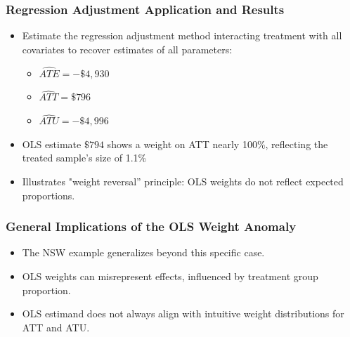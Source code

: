 \documentclass{beamer}
\begin{document}
\begin{frame}
\frametitle{Regression Adjustment Application and Results}
\begin{itemize}
  \item Estimate the regression adjustment method interacting treatment with all covariates to recover estimates of all parameters:
    \begin{itemize}
      \item \( \widehat{ATE} = -\$4,930 \)
      \item \( \widehat{ATT} = \$796 \)
      \item \( \widehat{ATU} = -\$4,996 \)
    \end{itemize}
  \item OLS estimate \( \$794 \) shows a weight on ATT nearly 100\%, reflecting the treated sample's size of 1.1\%
  \item Illustrates "weight reversal''  principle: OLS weights do not reflect expected proportions.
\end{itemize}
\end{frame}

\begin{frame}
\frametitle{General Implications of the OLS Weight Anomaly}
\begin{itemize}
  \item The NSW example generalizes beyond this specific case.
  \item OLS weights can misrepresent effects, influenced by treatment group proportion.
  \item OLS estimand does not always align with intuitive weight distributions for ATT and ATU.
\end{itemize}
\end{frame}
\end{document}
